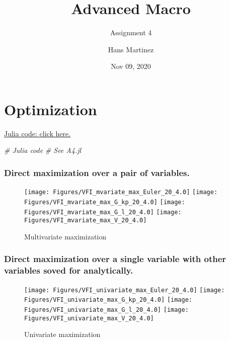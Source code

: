 \documentclass[
]{article}
\title{Advanced Macro}
\subtitle{Assignment 4}
\author{Hans Martinez}
\date{Nov 09, 2020}
\newenvironment{Shaded}{\begin{snugshade}}{\end{snugshade}}
\newcommand{\CommentTok}[1]{\textcolor[rgb]{0.56,0.35,0.01}{\textit{#1}}}
\begin{document}
\maketitle

\hypertarget{optimization}{%
\section{Optimization}\label{optimization}}

\href{https://github.com/hans-mtz/AdvMacro/blob/master/A4.jl}{Julia
code: click here.}

\begin{Shaded}
\begin{Highlighting}[]
\CommentTok{# Julia code}
\CommentTok{# See A4.jl}
\end{Highlighting}
\end{Shaded}

\hypertarget{direct-maximization-over-a-pair-of-variables.}{%
\subsubsection{Direct maximization over a pair of
variables.}\label{direct-maximization-over-a-pair-of-variables.}}

\begin{figure}

{\centering \texttt{[image: Figures/VFI\_mvariate\_max\_Euler\_20\_4.0]} \texttt{[image: Figures/VFI\_mvariate\_max\_G\_kp\_20\_4.0]} \texttt{[image: Figures/VFI\_mvariate\_max\_G\_l\_20\_4.0]} \texttt{[image: Figures/VFI\_mvariate\_max\_V\_20\_4.0]} 

}

\caption{Multivariate maximization}\label{fig:unnamed-chunk-2}
\end{figure}

\hypertarget{direct-maximization-over-a-single-variable-with-other-variables-soved-for-analytically.}{%
\subsubsection{Direct maximization over a single variable with other
variables soved for
analytically.}\label{direct-maximization-over-a-single-variable-with-other-variables-soved-for-analytically.}}

\begin{figure}

{\centering \texttt{[image: Figures/VFI\_univariate\_max\_Euler\_20\_4.0]} \texttt{[image: Figures/VFI\_univariate\_max\_G\_kp\_20\_4.0]} \texttt{[image: Figures/VFI\_univariate\_max\_G\_l\_20\_4.0]} \texttt{[image: Figures/VFI\_univariate\_max\_V\_20\_4.0]} 

}

\caption{Univariate maximization}\label{fig:unnamed-chunk-3}
\end{figure}
\end{document}
